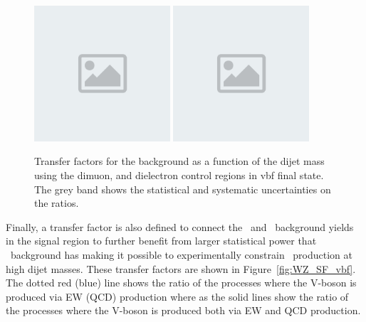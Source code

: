 \begin{figure}[htbp]
  \centering
        \includegraphics[width=0.45\textwidth]{placeholder.png}
        \includegraphics[width=0.45\textwidth]{placeholder.png}
\\
  \caption{Transfer factors for the \Zvvjets background as a function of the dijet mass using the dimuon, and dielectron control regions in vbf final state. The grey band shows the statistical and systematic uncertainties on the ratios. }
    \label{fig:ZvvZmmSF}
\end{figure}


Finally, a transfer factor is also defined to connect the \Zvvjets~and \Wlvjets~background yields
in the signal region to further benefit from larger statistical power that \Wlvjets~background has
making it possible to experimentally constrain \Zvvjets~production at high dijet masses.
These transfer factors are shown in Figure~\ref{fig:WZ_SF_vbf}. The dotted red (blue) line shows the ratio of the processes where the V-boson
is produced via EW (QCD) production where as the solid lines show the ratio of the processes where the V-boson is produced both
via EW and QCD production.

